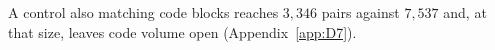 A control also matching code blocks reaches $3{,}346$ pairs against $7{,}537$ and, at that size, leaves code volume open (Appendix~\ref{app:D7}).

